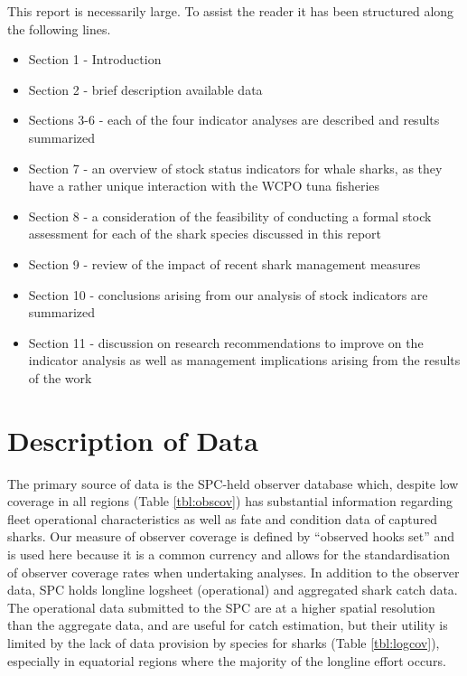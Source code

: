 \documentclass[12pt]{SCreport}
\begin{document}
This report is necessarily large. To assist the reader it has been structured along the following lines.
\begin{itemize}
\item Section 1 - Introduction
\item Section 2 - brief description available data
\item Sections 3-6 - each of the four indicator analyses are described and results summarized
\item Section 7 - an overview of stock status indicators for whale sharks, as they have a rather unique interaction with the WCPO tuna fisheries
\item Section 8 - a consideration of the feasibility of conducting a formal stock assessment for each of the shark species discussed in this report
\item Section 9 - review of the impact of recent shark management measures
\item Section 10 - conclusions arising from our analysis of stock indicators are summarized
\item Section 11 - discussion on research recommendations to improve on the indicator analysis as well as management implications arising from the results of the work
\end{itemize}

\section{Description of Data}

The primary source of data is the SPC-held observer database which, despite low coverage in all regions (Table \ref{tbl:obscov}) has substantial information regarding fleet operational characteristics as well as fate and condition data of captured sharks. Our measure of observer coverage is defined by “observed hooks set” and is used here because it is a common currency and allows for the standardisation of observer coverage rates when undertaking analyses. In addition to the observer data, SPC holds longline logsheet (operational) and aggregated shark catch data. The operational data submitted to the SPC are at a higher spatial resolution than the aggregate data, and are useful for catch estimation, but their utility is limited by the lack of data provision by species for sharks (Table \ref{tbl:logcov}), especially in equatorial regions where the majority of the longline effort occurs. 
\end{document}
